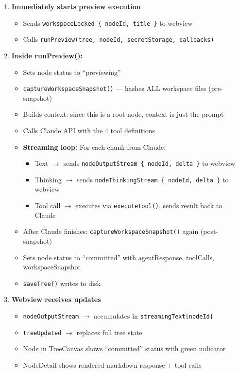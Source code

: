 \documentclass[12pt, a4paper]{article}
\begin{document}
\begin{enumerate}[label=\textbf{Step \arabic*:}, leftmargin=3cm]
    \item \textbf{Immediately starts preview execution}
    \begin{itemize}
        \item Sends \texttt{workspaceLocked \{ nodeId, title \}} to webview
        \item Calls \texttt{runPreview(tree, nodeId, secretStorage, callbacks)}
    \end{itemize}

    \item \textbf{Inside runPreview():}
    \begin{itemize}
        \item Sets node status to ``previewing''
        \item \texttt{captureWorkspaceSnapshot()} --- hashes ALL workspace files (pre-snapshot)
        \item Builds context: since this is a root node, context is just the prompt
        \item Calls Claude API with the 4 tool definitions
        \item \textbf{Streaming loop:} For each chunk from Claude:
        \begin{itemize}
            \item Text $\to$ sends \texttt{nodeOutputStream \{ nodeId, delta \}} to webview
            \item Thinking $\to$ sends \texttt{nodeThinkingStream \{ nodeId, delta \}} to webview
            \item Tool call $\to$ executes via \texttt{executeTool()}, sends result back to Claude
        \end{itemize}
        \item After Claude finishes: \texttt{captureWorkspaceSnapshot()} again (post-snapshot)
        \item Sets node status to ``committed'' with agentResponse, toolCalls, workspaceSnapshot
        \item \texttt{saveTree()} writes to disk
    \end{itemize}

    \item \textbf{Webview receives updates}
    \begin{itemize}
        \item \texttt{nodeOutputStream} $\to$ accumulates in \texttt{streamingText[nodeId]}
        \item \texttt{treeUpdated} $\to$ replaces full tree state
        \item Node in TreeCanvas shows ``committed'' status with green indicator
        \item NodeDetail shows rendered markdown response + tool calls
    \end{itemize}
\end{enumerate}
\end{document}
